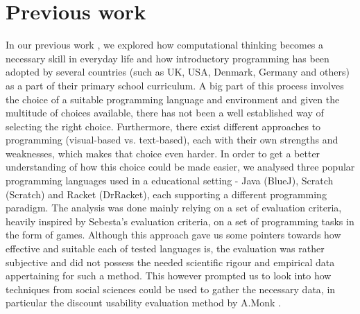 \chapter{Previous work}
\label{chapter:previous work}

In our previous work \cite{SemesterProject}, we explored how computational thinking becomes a necessary skill in everyday life and how introductory programming has been adopted by several countries (such as UK, USA, Denmark, Germany and others) as a part of their primary school curriculum. A big part of this process involves the choice of a suitable programming language and environment and given the multitude of choices available, there has not been a well established way of selecting the right choice. Furthermore, there exist different approaches to programming (visual-based vs. text-based), each with their own strengths and weaknesses, which makes that choice even harder. In order to get a better understanding of how this choice could be made easier, we analysed three popular programming languages used in a educational setting - Java (BlueJ), Scratch (Scratch) and Racket (DrRacket), each supporting a different programming paradigm. The analysis was done mainly relying on a set of evaluation criteria, heavily inspired by Sebesta's evaluation criteria, on a set of programming tasks in the form of games. Although this approach gave us some pointers towards how effective and
suitable each of tested languages is, the evaluation was rather subjective and did not possess the needed scientific rigour and empirical data appertaining for such a method. This however prompted us to look into how techniques from social sciences \cite{Bryman} could be used to gather the necessary data, in particular the discount usability evaluation method by A.Monk \cite{AndrewMonk}.